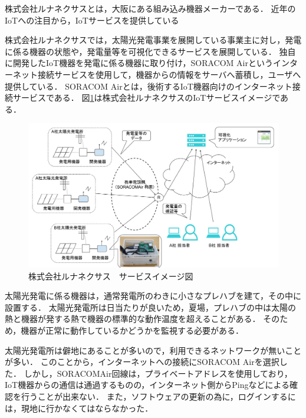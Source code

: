 株式会社ルナネクサスとは，大阪にある組み込み機器メーカーである．
近年のIoTへの注目から，IoTサービスを提供している

株式会社ルナネクサスでは，太陽光発電事業を展開している事業主に対し，発電に係る機器の状態や，発電量等を可視化できるサービスを展開している．
独自に開発したIoT機器を発電に係る機器に取り付け，SORACOM Airというインターネット接続サービスを使用して，機器からの情報をサーバへ蓄積し，ユーザへ提供している．
SORACOM Airとは，後術するIoT機器向けのインターネット接続サービスである．
図\ref{fig:lunafig}は株式会社ルナネクサスのIoTサービスイメージである．
\begin{figure}[htbp]
\includegraphics[width=16cm]{images/lunafig.png}
\caption{株式会社ルナネクサス　サービスイメージ図}
\label{fig:lunafig}
\end{figure}



太陽光発電に係る機器は，通常発電所のわきに小さなプレハブを建て，その中に設置する．
太陽光発電所は日当たりが良いため，夏場，プレハブの中は太陽の熱と機器が発する熱で機器の標準的な動作温度を超えることがある．
そのため，機器が正常に動作しているかどうかを監視する必要がある．

太陽光発電所は僻地にあることが多いので，利用できるネットワークが無いことが多い．
このことから，インターネットへの接続にSORACOM Airを選択した．
しかし，SORACOMAir回線は，プライベートアドレスを使用しており，IoT機器からの通信は通過するものの，インターネット側からPingなどによる確認を行うことが出来ない．
また，ソフトウェアの更新の為に，ログインするには，現地に行かなくてはならなかった．

